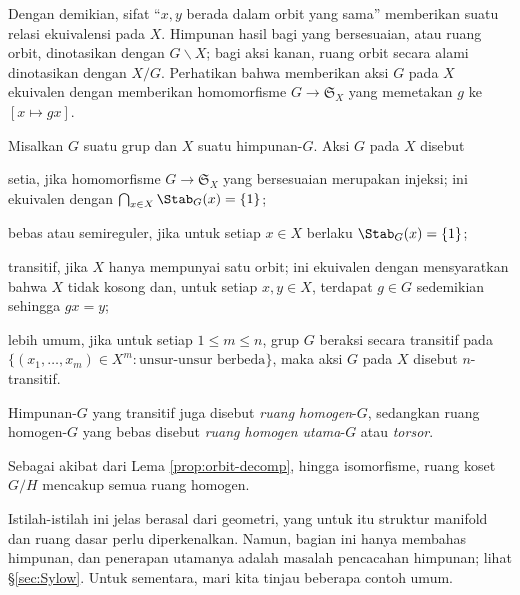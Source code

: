 Dengan demikian, sifat ``$x,y$ berada dalam orbit yang sama'' memberikan suatu relasi ekuivalensi pada $X$. Himpunan hasil bagi yang bersesuaian, atau ruang orbit, dinotasikan dengan $G \backslash X$; bagi aksi kanan, ruang orbit secara alami dinotasikan dengan $X/G$. Perhatikan bahwa memberikan aksi $G$ pada $X$ ekuivalen dengan memberikan homomorfisme $G \to \mathfrak{S}_X$ yang memetakan $g$ ke $[x \mapsto gx]$.
\begin{definition}
	Misalkan $G$ suatu grup dan $X$ suatu himpunan-$G$. Aksi $G$ pada $X$ disebut 
	\begin{compactitem}
		\item setia, jika homomorfisme $G \to \mathfrak{S}_X$ yang bersesuaian merupakan injeksi; ini ekuivalen dengan $\bigcap_{x \in X} \Stab_G(x) = \{1\}$;
		\item bebas atau semireguler, jika untuk setiap $x \in X$ berlaku $\Stab_G(x) = \{1\}$;
		\item transitif, jika $X$ hanya mempunyai satu orbit; ini ekuivalen dengan mensyaratkan bahwa $X$ tidak kosong dan, untuk setiap $x, y \in X$, terdapat $g \in G$ sedemikian sehingga $gx=y$;
		\item lebih umum, jika untuk setiap $1 \leq m \leq n$, grup $G$ beraksi secara transitif pada $\{ (x_1, \ldots, x_m) \in X^m: \text{unsur-unsur berbeda} \}$, maka aksi $G$ pada $X$ disebut $n$-transitif.
	\end{compactitem}

	Himpunan-$G$ yang transitif juga disebut \emph{ruang homogen}-$G$, sedangkan ruang homogen-$G$ yang bebas disebut \emph{ruang homogen utama}-$G$ atau \emph{torsor}.
\end{definition}
Sebagai akibat dari Lema \ref{prop:orbit-decomp}, hingga isomorfisme, ruang koset $G/H$ mencakup semua ruang homogen.

Istilah-istilah ini jelas berasal dari geometri, yang untuk itu struktur manifold dan ruang dasar perlu diperkenalkan. Namun, bagian ini hanya membahas himpunan, dan penerapan utamanya adalah masalah pencacahan himpunan; lihat \S\ref{sec:Sylow}. Untuk sementara, mari kita tinjau beberapa contoh umum.

